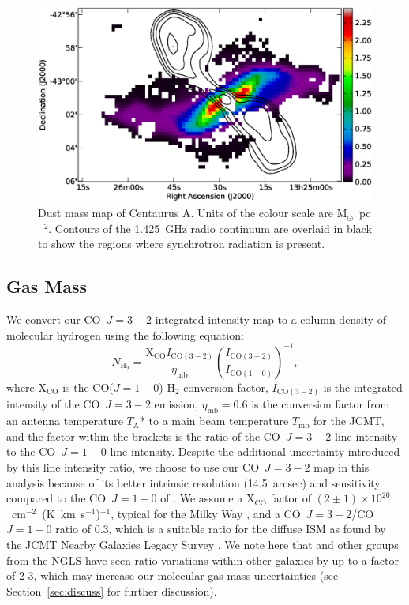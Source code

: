 \begin{figure}
\includegraphics[width=\columnwidth]{ch2/Fig5_CenA_dust_mass}
\caption[Dust mass map of the disc of Centaurus~A]{Dust mass map of Centaurus A.  Units of the colour scale are M$_{\odot}$~pc$^{-2}$.  Contours of the 1.425~GHz radio continuum are overlaid in black to show the regions where synchrotron radiation is present.}
\label{fig:dust_mass}
\end{figure}

\subsection{Gas Mass}\label{subsec:gas}
We convert our CO~$J=3-2$ integrated intensity map to a column density of molecular hydrogen using the following equation:
\begin{equation}\label{eqn:CO_col_density}
N_{\mathrm{H}_{2}} = \frac{\mathrm{X}_{\mathrm{CO}} I_{\mathrm{CO}(3-2)}}{\eta_{\mathrm{mb}}} \left(\frac{I_{\mathrm{CO}(3-2)}}{I_{\mathrm{CO}(1-0)}}\right)^{-1},
\end{equation}
where X$_{\mathrm{CO}}$ is the CO($J=1-0$)-H$_{2}$ conversion factor, $I_{\mathrm{CO}(3-2)}$ is the integrated intensity of the CO~$J=3-2$ emission, $\eta_{\mathrm{mb}}=0.6$ is the conversion factor from an antenna temperature $T_{\mathrm{A}}$* to a main beam temperature $T_{\mathrm{mb}}$ for the JCMT, and the factor within the brackets is the ratio of the CO~$J=3-2$ line intensity to the CO~$J=1-0$ line intensity.  Despite the additional uncertainty introduced by this line intensity ratio, we choose to use our CO~$J=3-2$ map in this analysis because of its better intrinsic resolution (14.5~arcsec) and sensitivity compared to the CO~$J=1-0$ of \citet{1990ApJ...363..451E}.  We assume a X$_{\mathrm{CO}}$ factor of $(2 \pm 1) \times 10^{20}$~cm$^{-2}$~(K~km~s$^{-1}$)$^{-1}$, typical for the Milky Way \citep{1988A&A...207....1S}, and a CO~$J=3-2$/CO~$J=1-0$ ratio of 0.3, which is a suitable ratio for the diffuse ISM as found by the JCMT Nearby Galaxies Legacy Survey \citep[NGLS;][]{2009ApJ...693.1736W}.  We note here that \citet{2009ApJ...693.1736W} and other groups from the NGLS have seen ratio variations within other galaxies by up to a factor of 2-3, which may increase our molecular gas mass uncertainties (see Section~\ref{sec:discuss} for further discussion).

